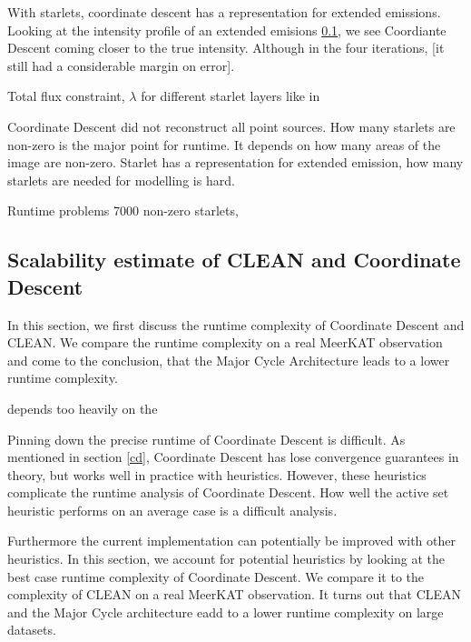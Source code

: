 With starlets, coordinate descent has a representation for extended emissions. Looking at the intensity profile of an extended emisions \ref{}, we see Coordiante Descent coming closer to the true intensity. Although in the four iterations,  [it still had a considerable margin on error]. 

Total flux constraint, $\lambda$ for different starlet layers like in \cite{girard2015sparse}

Coordinate Descent did not reconstruct all point sources. How many starlets are non-zero is the major point for runtime. It depends on how many areas of the image are non-zero. Starlet has a representation for extended emission, how many starlets are needed for modelling is hard.

Runtime problems
7000 non-zero starlets, 


\subsection{Scalability estimate of CLEAN and Coordinate Descent}
In this section, we first discuss the runtime complexity of Coordinate Descent and CLEAN. We compare the runtime complexity on a real MeerKAT observation and come to the conclusion, that the Major Cycle Architecture leads to a lower runtime complexity. 

 depends too heavily on the


Pinning down the precise runtime of Coordinate Descent is difficult. As mentioned in section \ref{cd}, Coordinate Descent has lose convergence guarantees in theory, but works well in practice with heuristics. However, these heuristics complicate the runtime analysis of Coordinate Descent. How well the active set heuristic performs on an average case is a difficult analysis.

Furthermore the current implementation can potentially be improved with other heuristics. In this section, we account for potential heuristics by looking at the best case runtime complexity of Coordinate Descent. We compare it to the complexity of CLEAN on a real MeerKAT observation. It turns out that CLEAN and the Major Cycle architecture eadd to a lower runtime complexity on large datasets.


